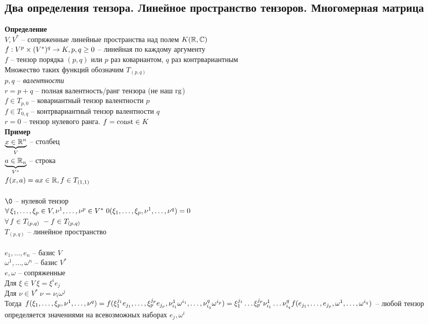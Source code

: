 \documentclass[12pt]{article}
\begin{document}
\subsection{Два определения тензора. Линейное пространство тензоров. Многомерная матрица}
\textbf{Определение}\\
$V, V^*$ -- сопряженные линейные пространства над полем $K(\Rset, \Cset)$\\
$f: V^p\times (V^*)^q \rto K, p, q \geq 0$ -- линейная по каждому аргументу\\
$f$ -- тензор порядка $(p,q)$ или $p$ раз ковариантом, $q$ раз контрвариантным\\
Множество таких функций обозначим $T_{(p,q)}$\\
$p,q$ -- \textit{валентности}\\
$r = p+q$ -- полная валентность/ранг тензора (не наш $\rg$)\\
$f \in T_{p,0}$ -- ковариантный тензор валентности $p$\\
$f \in T_{0,q}$ -- контрвариантный тензор валентности $q$\\
$r = 0$ -- тензор нулевого ранга. $f = \const \in K$\\
\textbf{Пример}\\
$\ub{V}{x \in \Rset^n}$ -- столбец\\
$\ub{V^*}{a \in \Rset_n}$ -- строка\\
$f(x,a) = ax \in \Rset, f \in T_{(1,1)}$\\\\
$\0$ -- нулевой тензор\\
$\fall \xi_1, \ldots, \xi_p \in V, \nu^1, \ldots, \nu^p \in V^*\ 0(\xi_1, \ldots, \xi_p, \nu^1,\ldots,\nu^q) = 0$\\
$\fall f \in T_{(p,q)}\ -f \in T_{(p,q)}$\\
$T_{(p,q)}$ -- линейное пространство\\\\
$e_1, \ldots, e_n$ -- базис $V$\\
$\omega^1, \ldots, \omega^n$ -- базис $V^*$\\
$e, \omega$ -- сопряженные\\
Для $\xi \in V\ \xi = \xi^i e_j$\\
Для $\nu \in V^*\ \nu = \nu_i \omega^j$\\
Тогда $f(\xi_1, \ldots, \xi_p, \nu^1, \ldots, \nu^q) = f(\xi_1^{j_1} e_{j_1}, \ldots, \xi_p^{j_p}e_{j_p}, \nu^1_{i_1}\omega^{i_1}, \ldots, \nu^q_{i_q}\omega^{i_p})\\ = \xi_1^{j_1}\ldots\xi_p^{j_p}\nu^1_{i_1}\ldots\nu^q_{i_q}f(e_{j_1},\ldots,e_{j_p},\omega^1,\ldots,\omega^{i_q})$ -- любой тензор определяется значениями на всевозможных наборах $e_j, \omega^i$\\
\end{document}
